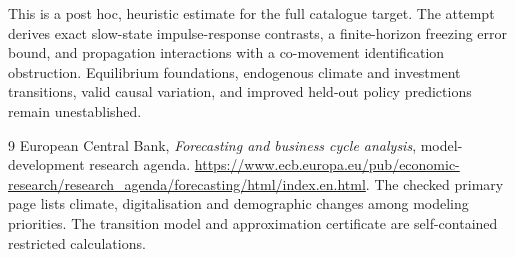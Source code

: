 \documentclass[11pt,a4paper]{article}
\begin{document}
This is a post hoc, heuristic estimate for the full catalogue target.
The attempt derives exact slow-state impulse-response contrasts, a finite-horizon freezing error bound, and propagation interactions with a co-movement identification obstruction. Equilibrium foundations, endogenous climate and investment transitions, valid causal variation, and improved held-out policy predictions remain unestablished.

\begin{thebibliography}{9}
 European Central Bank, \emph{Forecasting and business cycle analysis}, model-development research agenda. \url{https://www.ecb.europa.eu/pub/economic-research/research_agenda/forecasting/html/index.en.html}. The checked primary page lists climate, digitalisation and demographic changes among modeling priorities. The transition model and approximation certificate are self-contained restricted calculations.
\end{thebibliography}
\end{document}
